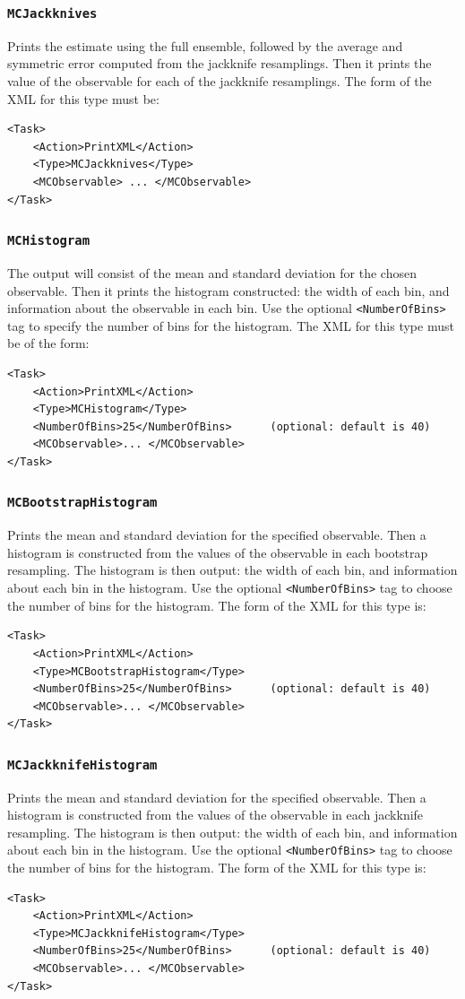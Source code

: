 \documentclass[12pt]{article}
\newcommand{\vb}{\texttt}
\begin{document}
\subsubsection{\vb{MCJackknives}}
Prints the estimate using the full ensemble, followed by
the average and symmetric error computed from the jackknife resamplings.
Then it prints the value of the observable for each of the jackknife resamplings.
The form of the XML for this type must be:
\begin{verbatim}
<Task>
    <Action>PrintXML</Action>
    <Type>MCJackknives</Type>
    <MCObservable> ... </MCObservable>
</Task>
\end{verbatim}
\subsubsection{\vb{MCHistogram}}
The output will consist of the mean and standard deviation for the chosen
observable. Then it prints the histogram constructed: the width of each bin, and information
about the observable in each bin.
Use the optional \vb{<NumberOfBins>} tag to specify the number of
bins for the histogram. The XML for this type must be of the form:
\begin{verbatim}
<Task>
    <Action>PrintXML</Action>
    <Type>MCHistogram</Type>
    <NumberOfBins>25</NumberOfBins>      (optional: default is 40)
    <MCObservable>... </MCObservable>
</Task>
\end{verbatim}
\subsubsection{\vb{MCBootstrapHistogram}}
Prints the mean and standard deviation for the specified observable.
Then a histogram is constructed from the values of the observable in each bootstrap resampling.
The histogram is then output: the width of each bin, and information about each bin in the histogram.
Use the optional \vb{<NumberOfBins>} tag to choose the number of bins for the histogram.
The form of the XML for this type is:
\begin{verbatim}
<Task>
    <Action>PrintXML</Action>
    <Type>MCBootstrapHistogram</Type>
    <NumberOfBins>25</NumberOfBins>      (optional: default is 40)
    <MCObservable>... </MCObservable>
</Task>
\end{verbatim}
\subsubsection{\vb{MCJackknifeHistogram}}
Prints the mean and standard deviation for the specified observable.
Then a histogram is constructed from the values of the observable in each jackknife resampling.
The histogram is then output: the width of each bin, and information about each bin in the histogram.
Use the optional \vb{<NumberOfBins>} tag to choose the number of bins for the histogram.
The form of the XML for this type is:
\begin{verbatim}
<Task>
    <Action>PrintXML</Action>
    <Type>MCJackknifeHistogram</Type>
    <NumberOfBins>25</NumberOfBins>      (optional: default is 40)
    <MCObservable>... </MCObservable>
</Task>
\end{verbatim}
\end{document}
